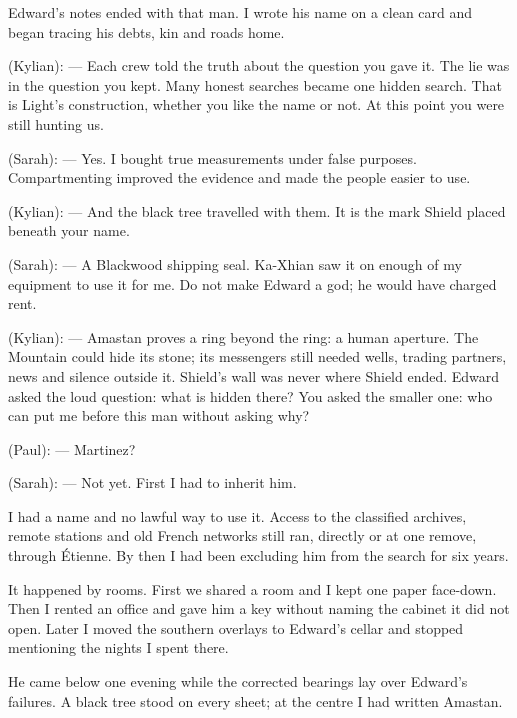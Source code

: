 Edward's notes ended with that man. I wrote his name on a clean card and began tracing his debts, kin and roads home.\par

\begin{room}

(Kylian): --- Each crew told the truth about the question you gave it. The lie was in the question you kept. Many honest searches became one hidden search. That is Light's construction, whether you like the name or not. At this point you were still hunting us.

(Sarah): --- Yes. I bought true measurements under false purposes. Compartmenting improved the evidence and made the people easier to use.

(Kylian): --- And the black tree travelled with them. It is the mark Shield placed beneath your name.

(Sarah): --- A Blackwood shipping seal. Ka-Xhian saw it on enough of my equipment to use it for me. Do not make Edward a god; he would have charged rent.

(Kylian): --- Amastan proves a ring beyond the ring: a human aperture. The Mountain could hide its stone; its messengers still needed wells, trading partners, news and silence outside it. Shield's wall was never where Shield ended. Edward asked the loud question: what is hidden there? You asked the smaller one: who can put me before this man without asking why?

(Paul): --- Martinez?

(Sarah): --- Not yet. First I had to inherit him.

\end{room}

I had a name and no lawful way to use it. Access to the classified archives, remote stations and old French networks still ran, directly or at one remove, through Étienne. By then I had been excluding him from the search for six years.\par

It happened by rooms. First we shared a room and I kept one paper face-down. Then I rented an office and gave him a key without naming the cabinet it did not open. Later I moved the southern overlays to Edward's cellar and stopped mentioning the nights I spent there.\par

He came below one evening while the corrected bearings lay over Edward's failures. A black tree stood on every sheet; at the centre I had written Amastan.\par

